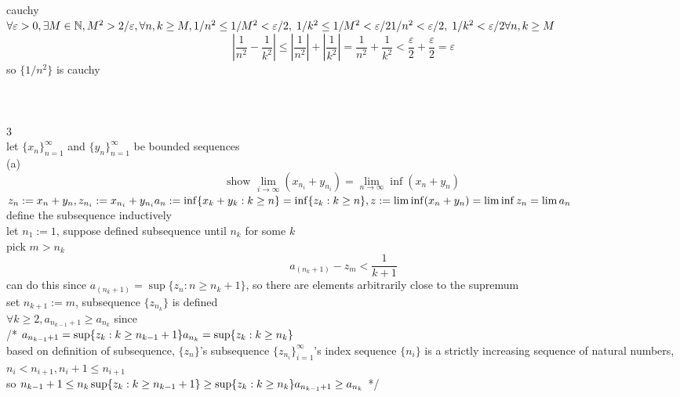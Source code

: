 \documentclass[12pt, border = 4pt, multi]{article} %
\begin{document}
cauchy\\
$\forall \varepsilon > 0, \exists M \in \mathbb{N}, M ^ 2 > 2 / \varepsilon, \forall n, k \geq M, 1 / n ^ 2 \leq 1 / M ^ 2 < \varepsilon / 2,\; 1 / k ^ 2 \leq 1 / M ^ 2 < \varepsilon / 2\\
1 / n ^ 2 < \varepsilon / 2,\;1 / k ^ 2 < \varepsilon / 2\\
\forall n, k \geq M$
\[\left|\frac{1}{n ^ 2} - \frac{1}{k ^ 2}\right| \leq \left|\frac{1}{n ^ 2}\right| + \left|\frac{1}{k ^ 2}\right| = \frac{1}{n ^ 2} + \frac{1}{k ^ 2} < \frac{\varepsilon}{2} + \frac{\varepsilon}{2} = \varepsilon\]
so $\{1 / n ^ 2\}$ is cauchy\\
\\
\\
\\
3\\
let $\{x_n\}_{n = 1} ^ {\infty}$ and $\{y_n\}_{n = 1} ^ {\infty}$ be bounded sequences\\
(a)
\[\text{show } \lim_{i \rightarrow \infty} (x_{n_i} + y_{n_i}) = \lim_{n \rightarrow \infty}\inf(x_n + y_n)\]
$z_n := x_n + y_n, z_{n_i} := x_{n_i} + y_{n_i}\\
a_n := \inf\{x_k + y_k: k \geq n\} = \inf\{z_k: k \geq n\}, z := \lim \inf (x_n + y_n) = \lim \inf z_n = \lim a_n$\\
define the subsequence inductively\\
let $n_1 := 1$, suppose defined subsequence until $n_k$ for some $k$\\
pick $m > n_k$
\[a_{(n_k + 1)} - z_m < \frac{1}{k + 1}\]
can do this since $a_{(n_k + 1)} = \sup\{z_n: n \geq n_k + 1\}$, so there are elements arbitrarily close to the supremum\\
set $n_{k + 1} := m$, subsequence $\{z_{n_k}\}$ is defined\\
$\forall k \geq 2, a_{n_{k - 1} + 1} \geq a_{n_k}$ since\\
/* $a_{n_{k - 1} + 1} = \sup\{z_k: k \geq n_{k - 1} + 1\}\\
a_{n_k} = \sup\{z_k: k \geq n_k\}$\\
based on definition of subsequence, $\{z_n\}$'s subsequence $\{z_{n_i}\}_{i = 1} ^ {\infty}$'s index sequence $\{n_i\}$ is a strictly increasing sequence of natural numbers, $n_i < n_{i + 1}, n_i + 1 \leq n_{i + 1}$\\
so $n_{k - 1} + 1 \leq n_k\\
\sup\{z_k: k \geq n_{k - 1} + 1\} \geq \sup\{z_k: k \geq n_k\}\\
a_{n_{k - 1} + 1} \geq a_{n_k}$ */\\
\end{document}
